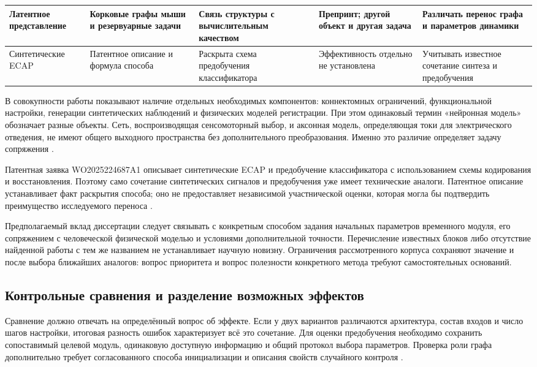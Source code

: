 \begin{longtable}{|T{26mm}|T{33mm}|T{33mm}|T{31mm}|T{29mm}|}
\hline
Латентное представление \cite{s892} & Корковые графы мыши и резервуарные задачи & Связь структуры с вычислительным качеством & Препринт; другой объект и другая задача & Различать перенос графа и параметров динамики \\
\hline
Синтетические ECAP \cite{s746} & Патентное описание и формула способа & Раскрыта схема предобучения классификатора & Эффективность отдельно не установлена & Учитывать известное сочетание синтеза и предобучения \\
\hline
\end{longtable}
\endgroup

В совокупности работы показывают наличие отдельных необходимых компонентов: коннектомных ограничений, функциональной настройки, генерации синтетических наблюдений и физических моделей регистрации. При этом одинаковый термин «нейронная модель» обозначает разные объекты. Сеть, воспроизводящая сенсомоторный выбор, и аксонная модель, определяющая токи для электрического отведения, не имеют общего выходного пространства без дополнительного преобразования. Именно это различие определяет задачу сопряжения \cite{s744,s775,ecapmodel}.

Патентная заявка WO2025224687A1 описывает синтетические ECAP и предобучение классификатора с использованием схемы кодирования и восстановления. Поэтому само сочетание синтетических сигналов и предобучения уже имеет технические аналоги. Патентное описание устанавливает факт раскрытия способа; оно не предоставляет независимой участнической оценки, которая могла бы подтвердить преимущество исследуемого переноса \cite{s746}.

Предполагаемый вклад диссертации следует связывать с конкретным способом задания начальных параметров временного модуля, его сопряжением с человеческой физической моделью и условиями дополнительной точности. Перечисление известных блоков либо отсутствие найденной работы с тем же названием не устанавливает научную новизну. Ограничения рассмотренного корпуса сохраняют значение и после выбора ближайших аналогов: вопрос приоритета и вопрос полезности конкретного метода требуют самостоятельных оснований.

\subsection{Контрольные сравнения и разделение возможных эффектов}

Сравнение должно отвечать на определённый вопрос об эффекте. Если у двух вариантов различаются архитектура, состав входов и число шагов настройки, итоговая разность ошибок характеризует всё это сочетание. Для оценки предобучения необходимо сохранить сопоставимый целевой модуль, одинаковую доступную информацию и общий протокол выбора параметров. Проверка роли графа дополнительно требует согласованного способа инициализации и описания свойств случайного контроля \cite{s741,s743}.

